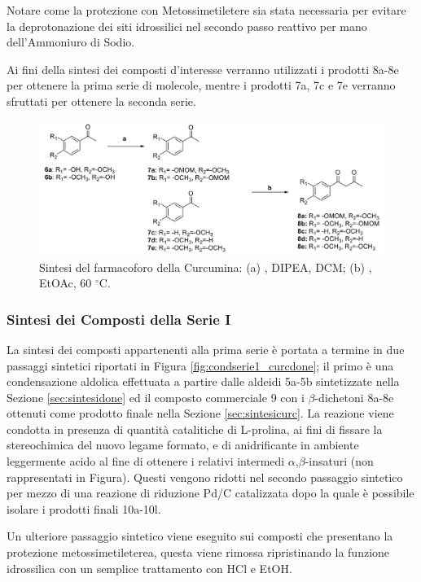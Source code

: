 \documentclass[a4paper, 12pt]{article}
\begin{document}
Notare come la protezione con Metossimetiletere sia stata necessaria per evitare la deprotonazione dei siti idrossilici nel secondo passo reattivo per mano dell'Ammoniuro di Sodio.

Ai fini della sintesi dei composti d'interesse verranno utilizzati i prodotti 8a-8e per ottenere la prima serie di molecole, mentre i prodotti 7a, 7c e 7e  verranno sfruttati per ottenere la seconda serie.

\begin{figure}[H]
	\centering
	\includegraphics[width=\linewidth]{immagini/farmacurc_curcdone.png}
	\caption{Sintesi del farmacoforo della Curcumina: (a) , DIPEA, DCM; (b)  , EtOAc, 60 $^\circ$C.}
	\label{fig:farmacurc_curcdone}
\end{figure}



\subsubsection{Sintesi dei Composti della Serie I}
\label{sec:condserie1}
La sintesi dei composti appartenenti alla prima serie è portata a termine in due passaggi sintetici riportati in Figura \ref{fig:condserie1_curcdone}; il primo è una condensazione aldolica effettuata a partire dalle aldeidi 5a-5b sintetizzate nella Sezione \ref{sec:sintesidone} ed il composto commerciale 9 con i $\beta$-dichetoni 8a-8e ottenuti come prodotto finale nella Sezione \ref{sec:sintesicurc}. La reazione viene condotta in presenza di quantità catalitiche di L-prolina, ai fini di fissare la stereochimica del nuovo legame formato, e di anidrificante  in ambiente leggermente acido al fine di ottenere i relativi intermedi $\alpha$,$\beta$-insaturi (non rappresentati in Figura). Questi	vengono ridotti nel secondo passaggio sintetico per mezzo di una reazione di riduzione Pd/C catalizzata dopo la quale è possibile isolare i prodotti finali 10a-10l.

Un ulteriore passaggio sintetico viene eseguito sui composti che presentano la protezione metossimetileterea, questa viene rimossa ripristinando la funzione idrossilica con un semplice trattamento con HCl e EtOH.
\end{document}
